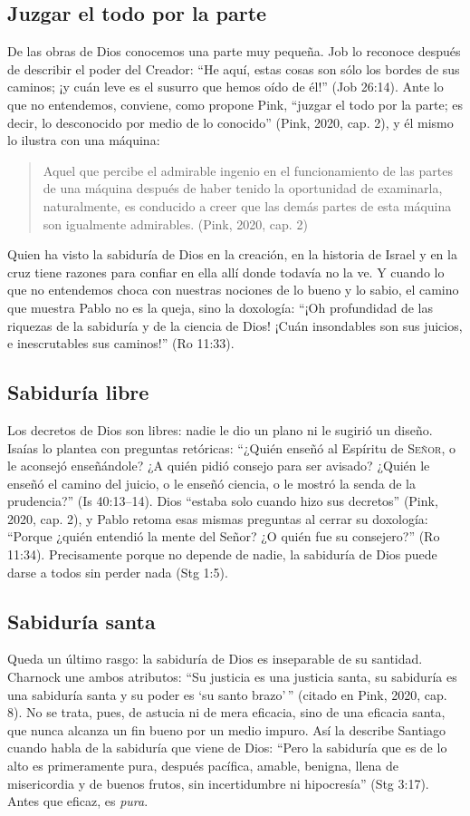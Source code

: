 \documentclass[11pt,letterpaper]{article}
\newcommand{\SENOR}{\textsc{Señor}}
\begin{document}
\subsection{Juzgar el todo por la parte}
De las obras de Dios conocemos una parte muy pequeña. Job lo reconoce después de describir el poder del Creador: ``He aquí, estas cosas son sólo los bordes de sus caminos; ¡y cuán leve es el susurro que hemos oído de él!'' (Job 26:14). Ante lo que no entendemos, conviene, como propone Pink, ``juzgar el todo por la parte; es decir, lo desconocido por medio de lo conocido'' (Pink, 2020, cap. 2), y él mismo lo ilustra con una máquina:

\begin{quote}\small
Aquel que percibe el admirable ingenio en el funcionamiento de las partes de una máquina después de haber tenido la oportunidad de examinarla, naturalmente, es conducido a creer que las demás partes de esta máquina son igualmente admirables. (Pink, 2020, cap. 2)
\end{quote}

Quien ha visto la sabiduría de Dios en la creación, en la historia de Israel y en la cruz tiene razones para confiar en ella allí donde todavía no la ve. Y cuando lo que no entendemos choca con nuestras nociones de lo bueno y lo sabio, el camino que muestra Pablo no es la queja, sino la doxología: ``¡Oh profundidad de las riquezas de la sabiduría y de la ciencia de Dios! ¡Cuán insondables son sus juicios, e inescrutables sus caminos!'' (Ro 11:33).

\subsection{Sabiduría libre}
Los decretos de Dios son libres: nadie le dio un plano ni le sugirió un diseño. Isaías lo plantea con preguntas retóricas: ``¿Quién enseñó al Espíritu de \SENOR{}, o le aconsejó enseñándole? ¿A quién pidió consejo para ser avisado? ¿Quién le enseñó el camino del juicio, o le enseñó ciencia, o le mostró la senda de la prudencia?'' (Is 40:13--14). Dios ``estaba solo cuando hizo sus decretos'' (Pink, 2020, cap. 2), y Pablo retoma esas mismas preguntas al cerrar su doxología: ``Porque ¿quién entendió la mente del Señor? ¿O quién fue su consejero?'' (Ro 11:34). Precisamente porque no depende de nadie, la sabiduría de Dios puede darse a todos sin perder nada (Stg 1:5).

\subsection{Sabiduría santa}
Queda un último rasgo: la sabiduría de Dios es inseparable de su santidad. Charnock une ambos atributos: ``Su justicia es una justicia santa, su sabiduría es una sabiduría santa y su poder es `su santo brazo'\,'' (citado en Pink, 2020, cap. 8). No se trata, pues, de astucia ni de mera eficacia, sino de una eficacia santa, que nunca alcanza un fin bueno por un medio impuro. Así la describe Santiago cuando habla de la sabiduría que viene de Dios: ``Pero la sabiduría que es de lo alto es primeramente pura, después pacífica, amable, benigna, llena de misericordia y de buenos frutos, sin incertidumbre ni hipocresía'' (Stg 3:17). Antes que eficaz, es \emph{pura}.
\end{document}
